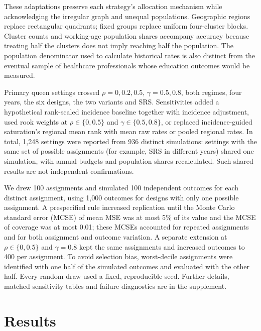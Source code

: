 \documentclass[Afour,sagev,times]{sagej}
\begin{document}
These adaptations preserve each strategy's allocation mechanism while acknowledging the irregular graph and unequal populations. Geographic regions replace rectangular quadrants; fixed groups replace uniform four-cluster blocks. Cluster counts and working-age population shares accompany accuracy because treating half the clusters does not imply reaching half the population. The population denominator used to calculate historical rates is also distinct from the eventual sample of healthcare professionals whose education outcomes would be measured.

Primary queen settings crossed $\rho=0,0.2,0.5$, $\gamma=0.5,0.8$, both regimes, four years, the six designs, the two variants and SRS. Sensitivities added a hypothetical rank-scaled incidence baseline together with incidence adjustment, used rook weights at $\rho\in\{0,0.5\}$ and $\gamma\in\{0.5,0.8\}$, or replaced incidence-guided saturation's regional mean rank with mean raw rates or pooled regional rates. In total, 1,248 settings were reported from 936 distinct simulations: settings with the same set of possible assignments (for example, SRS in different years) shared one simulation, with annual budgets and population shares recalculated. Such shared results are not independent confirmations.

We drew 100 assignments and simulated 100 independent outcomes for each distinct assignment, using 1,000 outcomes for designs with only one possible assignment. A prespecified rule increased replication until the Monte Carlo standard error (MCSE) of mean MSE was at most 5\% of its value and the MCSE of coverage was at most 0.01; these MCSEs accounted for repeated assignments and for both assignment and outcome variation. A separate extension at $\rho\in\{0,0.5\}$ and $\gamma=0.8$ kept the same assignments and increased outcomes to 400 per assignment. To avoid selection bias, worst-decile assignments were identified with one half of the simulated outcomes and evaluated with the other half. Every random draw used a fixed, reproducible seed. Further details, matched sensitivity tables and failure diagnostics are in the supplement.

\section{Results}
\end{document}
